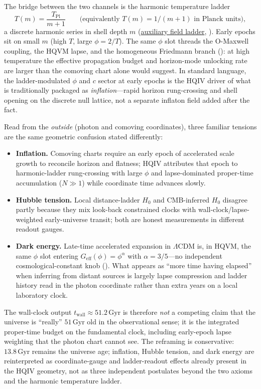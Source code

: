 \documentclass[11pt]{amsart}
\begin{document}
The bridge between the two channels is the harmonic temperature ladder
\[
  T(m)=\frac{T_{\mathrm{Pl}}}{m+1}
  \qquad\text{(equivalently $T(m)=1/(m+1)$ in Planck units)},
\]
a discrete harmonic series in shell depth $m$ (\hyperref[lean:auxiliary-field]{auxiliary field ladder}, \cite{hqiv-thermo-arrow-paper}). Early epochs sit on small $m$ (high $T$, large $\phi=2/T$). The same $\phi$ slot threads the O-Maxwell coupling, the HQVM lapse, and the homogeneous Friedmann branch (\cite{hqiv-oct-action-paper}): at high temperature the effective propagation budget and horizon-mode unlocking rate are larger than the comoving chart alone would suggest. In standard language, the ladder-modulated $\phi$ and $c$ sector at early epochs is the HQIV driver of what is traditionally packaged as \emph{inflation}---rapid horizon rung-crossing and shell opening on the discrete null lattice, not a separate inflaton field added after the fact.

Read from the \emph{outside} (photon and comoving coordinates), three familiar tensions are the same geometric confusion stated differently:
\begin{itemize}[nosep,leftmargin=1.5em]
\item \textbf{Inflation.} Comoving charts require an early epoch of accelerated scale growth to reconcile horizon and flatness; HQIV attributes that epoch to harmonic-ladder rung-crossing with large $\phi$ and lapse-dominated proper-time accumulation ($N\gg 1$) while coordinate time advances slowly.
\item \textbf{Hubble tension.} Local distance-ladder $H_0$ and CMB-inferred $H_0$ disagree partly because they mix look-back constrained clocks with wall-clock/lapse-weighted early-universe transit; both are honest measurements in different readout gauges.
\item \textbf{Dark energy.} Late-time accelerated expansion in $\Lambda$CDM is, in HQVM, the same $\phi$ slot entering $G_{\mathrm{eff}}(\phi)=\phi^{\alpha}$ with $\alpha=3/5$---no independent cosmological-constant knob (\cite{hqiv-oct-action-paper}). What appears as ``more time having elapsed'' when inferring from distant sources is largely lapse compression and ladder history read in the photon coordinate rather than extra years on a local laboratory clock.
\end{itemize}
The wall-clock output $t_{\mathrm{wall}}\approx 51.2\,\mathrm{Gyr}$ is therefore \emph{not} a competing claim that the universe is ``really'' $51\,\mathrm{Gyr}$ old in the observational sense; it is the integrated proper-time budget on the fundamental clock, including early-epoch lapse weighting that the photon chart cannot see. The reframing is conservative: $13.8\,\mathrm{Gyr}$ remains the universe age; inflation, Hubble tension, and dark energy are reinterpreted as coordinate-gauge and ladder-readout effects already present in the HQIV geometry, not as three independent postulates beyond the two axioms and the harmonic temperature ladder.
\end{document}
